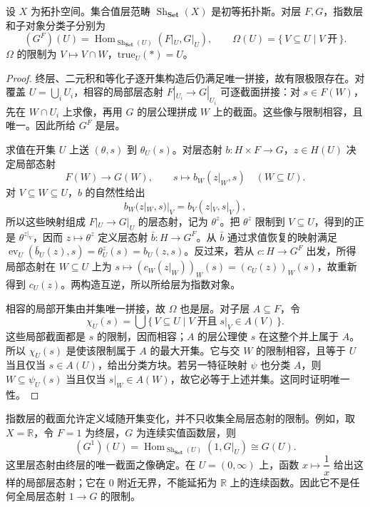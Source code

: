 \begin{proposition}\label{b4:prop:space-sheaf-topos}
	设 \(X\) 为拓扑空间。集合值层范畴 \(\operatorname{Sh}_{\mathbf{Set}}(X)\) 是初等拓扑斯。对层 \(F,G\)，指数层和子对象分类子分别为
	\[
		(G^F)(U)=\operatorname{Hom}_{\operatorname{Sh}_{\mathbf{Set}}(U)}(F|_U,G|_U), \qquad \Omega(U)=\{\,V\subseteq U\mid V\;\text{开}\,\}.
	\]
	\(\Omega\) 的限制为 \(V\mapsto V\cap W\)，\(\mathrm{true}_U(*)=U\)。
\end{proposition}
\begin{proof}
	终层、二元积和等化子逐开集构造后仍满足唯一拼接，故有限极限存在。对覆盖 \(U=\bigcup_iU_i\)，相容的局部层态射 \(F|_{U_i}\to G|_{U_i}\) 可逐截面拼接：对 \(s\in F(W)\)，先在 \(W\cap U_i\) 上求像，再用 \(G\) 的层公理拼成 \(W\) 上的截面。这些像与限制相容，且唯一。因此所给 \(G^F\) 是层。

	求值在开集 \(U\) 上送 \((\theta,s)\) 到 \(\theta_U(s)\)。对层态射 \(b:H\times F\to G\)，\(z\in H(U)\) 决定局部态射
	\[
		F(W)\longrightarrow G(W),\qquad s\longmapsto b_W(z|_W,s)\quad(W\subseteq U).
	\]
	对 \(V\subseteq W\subseteq U\)，\(b\) 的自然性给出
	\[
		b_W(z|_W,s)|_V=b_V(z|_V,s|_V),
	\]
	所以这些映射组成 \(F|_U\to G|_U\) 的层态射，记为 \(\theta^z\)。把 \(\theta^z\) 限制到 \(V\subseteq U\)，得到的正是 \(\theta^{z|_V}\)，因而 \(z\mapsto\theta^z\) 定义层态射 \(\bar b:H\to G^F\)。从 \(\bar b\) 通过求值恢复的映射满足 \(\operatorname{ev}_U(\bar b_U(z),s)=\theta^z_U(s)=b_U(z,s)\)。反过来，若从 \(c:H\to G^F\) 出发，所得局部态射在 \(W\subseteq U\) 上为 \(s\mapsto(c_W(z|_W))_W(s)=(c_U(z))_W(s)\)，故重新得到 \(c_U(z)\)。两构造互逆，所以所给层为指数对象。

	相容的局部开集由并集唯一拼接，故 \(\Omega\) 也是层。对子层 \(A\subseteq F\)，令
	\[
		\chi_U(s)=\bigcup\{\,V\subseteq U\mid V\;\text{开且}\;s|_V\in A(V)\,\}.
	\]
	这些局部截面都是 \(s\) 的限制，因而相容；\(A\) 的层公理使 \(s\) 在这整个并上属于 \(A\)。所以 \(\chi_U(s)\) 是使该限制属于 \(A\) 的最大开集。它与交 \(W\) 的限制相容，且等于 \(U\) 当且仅当 \(s\in A(U)\)，给出分类方块。若另一特征映射 \(\psi\) 也分类 \(A\)，则 \(W\subseteq\psi_U(s)\) 当且仅当 \(s|_W\in A(W)\)，故它必等于上述并集。这同时证明唯一性。
\end{proof}

指数层的截面允许定义域随开集变化，并不只收集全局层态射的限制。例如，取 \(X=\mathbb R\)，令 \(F=1\) 为终层，\(G\) 为连续实值函数层，则
\[
	(G^1)(U)=\operatorname{Hom}_{\operatorname{Sh}_{\mathbf{Set}}(U)}(1,G|_U) \cong G(U).
\]
这里层态射由终层的唯一截面之像确定。在 \(U=(0,\infty)\) 上，函数 \(x\mapsto\dfrac1x\) 给出这样的局部层态射；它在 \(0\) 附近无界，不能延拓为 \(\mathbb R\) 上的连续函数。因此它不是任何全局层态射 \(1\to G\) 的限制。

